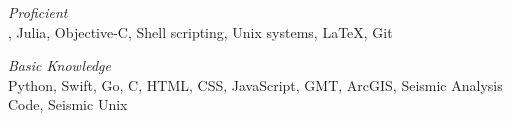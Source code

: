 %
\emph{Proficient}\\
\ML, Julia, Objective-C, Shell scripting, Unix systems, \LaTeX, Git

\medskip

\emph{Basic Knowledge}\\
Python, Swift, Go, C, HTML, CSS, JavaScript, GMT, ArcGIS, Seismic Analysis Code,
Seismic Unix

\bigskip
